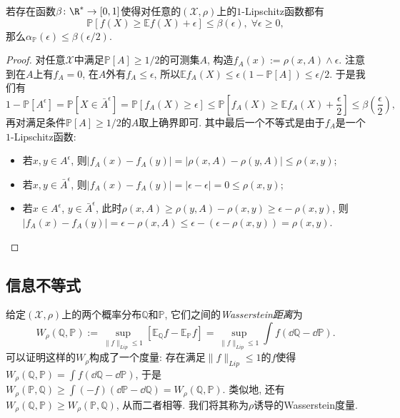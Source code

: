\begin{theorem}
	若存在函数$\beta \colon \R^* \to [0, 1]$使得对任意的$(\mathcal{X}, \rho)$上的$1$-Lipschitz函数都有
	\begin{equation*}
		\mathbb{P}[f(X) \geq \mathbb{E}f(X) + \epsilon] \leq \beta(\epsilon),\; \forall \epsilon \geq 0, 
	\end{equation*}
	那么$\alpha_{\mathbb{P}}(\epsilon) \leq \beta(\epsilon / 2)$. 
\end{theorem}
\begin{proof}
	对任意$\mathcal{X}$中满足$\mathbb{P}[A] \geq 1/2$的可测集$A$, 构造$f_A(x) := \rho(x, A) \wedge \epsilon$. 
	注意到在$A$上有$f_A = 0$, 在$A$外有$f_A \leq \epsilon$, 所以$\mathbb{E}f_A(X) \leq \epsilon (1 - \mathbb{P}[A]) \leq \epsilon / 2$. 
	于是我们有
	\begin{equation*}
		1 - \mathbb{P}[A^\epsilon]
		= \mathbb{P}[X \in \bar A^{\epsilon}]
		= \mathbb{P}[f_A(X) \geq \epsilon] 
		\leq \mathbb{P}\left[f_A(X) \geq \mathbb{E}f_A(X) + \frac{\epsilon}{2}\right]
		\leq \beta\left( \frac{\epsilon}{2} \right),  
	\end{equation*}
	再对满足条件$\mathbb{P}[A] \geq 1/2$的$A$取上确界即可. 
	其中最后一个不等式是由于$f_A$是一个$1$-Lipschitz函数: 
	\begin{itemize}
		\item 若$x, y \in A^{\epsilon}$, 则$|f_A(x) - f_A(y)| = |\rho(x, A) - \rho(y, A) | \leq  \rho(x, y)$; 
		\item 若$x, y \in \bar A^{\epsilon}$, 则$|f_A(x) - f_A(y)| = |\epsilon - \epsilon| = 0 \leq \rho(x, y)$;
		\item 若$x \in A^{\epsilon}$, $y \in \bar A^{\epsilon}$, 此时$\rho(x, A) \geq \rho(y, A) - \rho(x, y) \geq \epsilon - \rho(x, y)$, 则$|f_A(x) - f_A(y)| =  \epsilon - \rho(x, A) \leq \epsilon - (\epsilon - \rho(x, y)) = \rho(x, y)$.
	\end{itemize}
\end{proof}


\subsection{信息不等式}

给定$(\mathcal{X}, \rho)$上的两个概率分布$\mathbb{Q}$和$\mathbb{P}$, 它们之间的\emph{Wasserstein距离}为
\begin{equation*}
	W_{\rho}(\mathbb{Q}, \mathbb{P}) 
	:= \sup_{\|f\|_{Lip} \leq 1} \left[ \mathbb{E}_{\mathbb{Q}} f - \mathbb{E}_{\mathbb{P}} f \right]
	= \sup_{\|f\|_{Lip} \leq 1} \int f (\dd \mathbb{Q} - \dd \mathbb{P}). 
\end{equation*}
可以证明这样的$W_{\rho}$构成了一个度量: 
存在满足$\|f\|_{Lip} \leq 1$的$f$使得$W_{\rho}(\mathbb{Q}, \mathbb{P}) = \int f (\dd \mathbb{Q} - \dd \mathbb{P})$, 于是$W_{\rho}(\mathbb{P}, \mathbb{Q}) \geq \int (-f) (\dd \mathbb{P} - \dd \mathbb{Q}) = W_{\rho}(\mathbb{Q}, \mathbb{P})$. 
类似地, 还有$W_{\rho}(\mathbb{Q}, \mathbb{P}) \geq W_{\rho}(\mathbb{P}, \mathbb{Q})$, 从而二者相等. 
我们将其称为$\rho$诱导的Wasserstein度量. 

